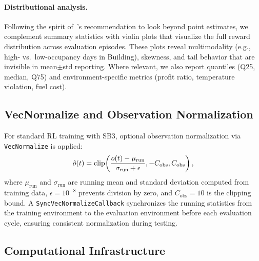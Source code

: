 \paragraph{Distributional analysis.} Following the spirit of~\citet{agarwal2021deep}'s recommendation to look beyond point estimates, we complement summary statistics with violin plots that visualize the full reward distribution across evaluation episodes. These plots reveal multimodality (e.g., high- vs.\ low-occupancy days in Building), skewness, and tail behavior that are invisible in mean$\pm$std reporting. Where relevant, we also report quantiles (Q25, median, Q75) and environment-specific metrics (profit ratio, temperature violation, fuel cost).


\subsection{VecNormalize and Observation Normalization}
\label{sec:vecnormalize}

For standard RL training with SB3, optional observation normalization via \texttt{VecNormalize} is applied:
\begin{equation}
    \hat{o}(t) = \operatorname{clip}\!\left(\frac{o(t) - \mu_{\text{run}}}{\sigma_{\text{run}} + \epsilon}, -C_{\text{obs}}, C_{\text{obs}}\right),
    \label{eq:vecnormalize}
\end{equation}
where $\mu_{\text{run}}$ and $\sigma_{\text{run}}$ are running mean and standard deviation computed from training data, $\epsilon = 10^{-8}$ prevents division by zero, and $C_{\text{obs}} = 10$ is the clipping bound. A \texttt{SyncVecNormalizeCallback} synchronizes the running statistics from the training environment to the evaluation environment before each evaluation cycle, ensuring consistent normalization during testing.

\subsection{Computational Infrastructure}
\label{sec:compute}

